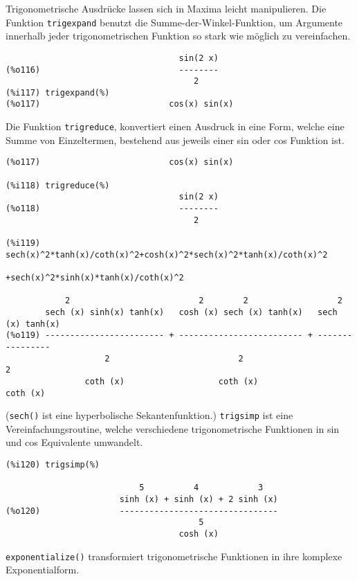 \documentclass[ngerman,12pt]{scrartcl}
\begin{document}
Trigonometrische Ausdrücke lassen sich in Maxima leicht manipulieren.
Die Funktion \texttt{trigexpand} benutzt die
Summe-der-Winkel-Funktion,  um Argumente innerhalb jeder
trigonometrischen Funktion so stark wie möglich zu vereinfachen.

\begin{verbatim}
                                   sin(2 x)
(%o116)                            --------
                                      2
(%i117) trigexpand(%)
(%o117)                          cos(x) sin(x)
\end{verbatim}

Die Funktion \texttt{trigreduce}, konvertiert einen Ausdruck in eine
Form, welche eine Summe von Einzeltermen, bestehend aus jeweils einer
sin oder cos Funktion ist.

\begin{verbatim}
(%o117)                          cos(x) sin(x)

(%i118) trigreduce(%)
                                   sin(2 x)
(%o118)                            --------
                                      2

(%i119) sech(x)^2*tanh(x)/coth(x)^2+cosh(x)^2*sech(x)^2*tanh(x)/coth(x)^2
                                   +sech(x)^2*sinh(x)*tanh(x)/coth(x)^2

            2                          2        2                  2
        sech (x) sinh(x) tanh(x)   cosh (x) sech (x) tanh(x)   sech (x) tanh(x)
(%o119) ------------------------ + ------------------------- + ----------------
                    2                          2                       2
                coth (x)                   coth (x)                coth (x)
\end{verbatim}

(\texttt{sech()} ist eine hyperbolische Sekantenfunktion.)
\texttt{trigsimp} ist eine Vereinfachungsroutine, welche verschiedene
trigonometrische Funktionen in sin und cos Equivalente umwandelt.

\begin{verbatim}
(%i120) trigsimp(%)

                           5          4            3
                       sinh (x) + sinh (x) + 2 sinh (x)
(%o120)                --------------------------------
                                       5
                                   cosh (x)
\end{verbatim}

\texttt{exponentialize()} transformiert trigonometrische Funktionen in ihre komplexe Exponentialform.
\end{document}
